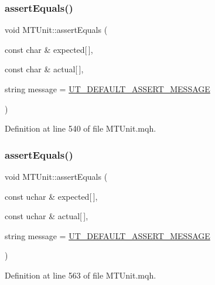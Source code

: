 \subsubsection{\texorpdfstring{assert\+Equals()}{assertEquals()}\hspace{0.1cm}{\footnotesize\ttfamily [16/28]}}
{\footnotesize\ttfamily void M\+T\+Unit\+::assert\+Equals (\begin{DoxyParamCaption}\item[{const char \&}]{expected\mbox{[}$\,$\mbox{]},  }\item[{const char \&}]{actual\mbox{[}$\,$\mbox{]},  }\item[{string}]{message = {\ttfamily \mbox{\hyperlink{_m_t_unit_8mqh_a96f5d62188d09039ebc3f443c9120e39}{U\+T\+\_\+\+D\+E\+F\+A\+U\+L\+T\+\_\+\+A\+S\+S\+E\+R\+T\+\_\+\+M\+E\+S\+S\+A\+GE}}} }\end{DoxyParamCaption})}



Definition at line 540 of file M\+T\+Unit.\+mqh.

\mbox{\label{class_m_t_unit_a2e881f961b6b85d908e47a632f0daa26}} 
\subsubsection{\texorpdfstring{assert\+Equals()}{assertEquals()}\hspace{0.1cm}{\footnotesize\ttfamily [17/28]}}
{\footnotesize\ttfamily void M\+T\+Unit\+::assert\+Equals (\begin{DoxyParamCaption}\item[{const uchar \&}]{expected\mbox{[}$\,$\mbox{]},  }\item[{const uchar \&}]{actual\mbox{[}$\,$\mbox{]},  }\item[{string}]{message = {\ttfamily \mbox{\hyperlink{_m_t_unit_8mqh_a96f5d62188d09039ebc3f443c9120e39}{U\+T\+\_\+\+D\+E\+F\+A\+U\+L\+T\+\_\+\+A\+S\+S\+E\+R\+T\+\_\+\+M\+E\+S\+S\+A\+GE}}} }\end{DoxyParamCaption})}



Definition at line 563 of file M\+T\+Unit.\+mqh.

\mbox{\label{class_m_t_unit_a071dd02f075cd278e383767684135ec8}} 
